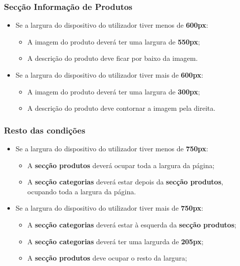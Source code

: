\documentclass[11pt]{article}   %
\begin{document}
\subsubsection{Secção Informação de Produtos}
\begin{itemize}
    \item Se a largura do dispositivo do utilizador tiver menos de \textbf{600px}:
    \begin{itemize}
        \item A imagem do produto deverá ter uma largura de \textbf{550px};
        \item A descrição do produto deve ficar por baixo da imagem.
    \end{itemize}
    \item Se a largura do dispositivo do utilizador tiver mais de \textbf{600px}:
    \begin{itemize}
        \item A imagem do produto deverá ter uma largura de \textbf{300px};
        \item A descrição do produto deve contornar a imagem pela direita.
    \end{itemize}
\end{itemize}

\subsubsection{Resto das condições}
\begin{itemize}
    \item Se a largura do dispositivo do utilizador tiver menos de \textbf{750px}:
    \begin{itemize}
        \item A \textbf{secção produtos} deverá ocupar toda a largura da página;
        \item A \textbf{secção categorias} deverá estar depois da \textbf{secção produtos}, ocupando toda a largura da página.
    \end{itemize}
    \item Se a largura do dispositivo do utilizador tiver mais de \textbf{750px}:
    \begin{itemize}
        \item A \textbf{secção categorias} deverá estar à esquerda da \textbf{secção produtos};
        \item A \textbf{secção categorias} deverá ter uma largurda de \textbf{205px};
        \item A \textbf{secção produtos} deve ocupar o resto da largura;
    \end{itemize}
\end{itemize}
\end{document}
